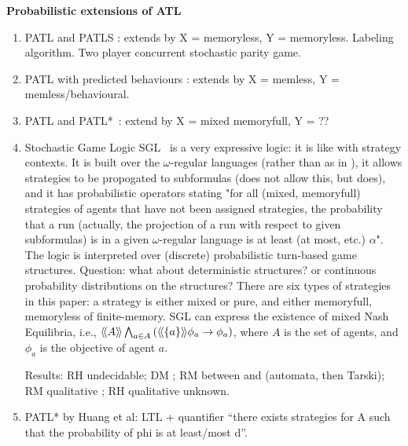 \textbf{Probabilistic extensions of ATL}
\begin{enumerate}
 \item PATL and PATLS \cite{DBLP:journals/fmsd/ChenFKPS13}:  extends \ATL by X = memoryless, Y = memoryless. Labeling algorithm. Two player concurrent stochastic parity game.
 \item PATL with predicted behaviours \cite{DBLP:journals/fuin/BullingJ09}: extends \ATL by X = memless, Y = memless/behavioural.
 \item PATL and PATL*~\cite{DBLP:conf/fskd/ChenL07a}: extend \ATLS by X = mixed memoryfull, Y = ??
 \item Stochastic Game Logic SGL~\cite{DBLP:journals/acta/BaierBGK12} is a very expressive logic: it is like \ATL with strategy contexts. It is built over the $\omega$-regular languages (rather than \LTL as in \SL), it allows strategies to be propogated to subformulas (\ATLS does not allow this, but \SL does), and it has probabilistic operators stating "for all (mixed, memoryfull) strategies of agents that have not been assigned strategies, the probability that a run (actually, the projection of a run with respect to given subformulas) is in a given $\omega$-regular language is at least (at most, etc.) $\alpha$". The logic is interpreted over (discrete) probabilistic turn-based game structures. Question: what about deterministic structures? or continuous probability distributions on the structures? There are six types of strategies in this paper: a strategy is either mixed or pure, and either memoryfull, memoryless of finite-memory. SGL can express the existence of mixed Nash Equilibria, i.e., $\atlE[A] \bigwedge_{a \in A} \left( \atlE[\{a\}] \phi_a \to \phi_a\right)$, where $A$ is the set of agents, and $\phi_a$ is the objective of agent $a$.  
 
 Results: RH undecidable; DM \pspaceC; RM between \pspace and \expspace (automata, then Tarski); RM qualitative \pspaceC; RH qualitative unknown.
 \item PATL* by Huang et al: LTL + quantifier ``there exists strategies for A such that the probability of phi is at least/most d''.
\end{enumerate}


